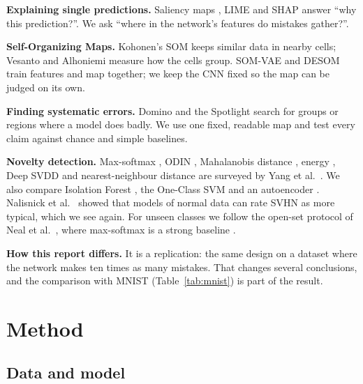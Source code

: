 \documentclass[11pt]{article}
\begin{document}
\textbf{Explaining single predictions.} Saliency maps \parencite{simonyan2014saliency}, LIME \parencite{ribeiro2016lime} and SHAP \parencite{lundberg2017shap} answer ``why this prediction?''. We ask ``where in the network's features do mistakes gather?''.

\textbf{Self-Organizing Maps.} Kohonen's SOM \parencite{kohonen1990som} keeps similar data in nearby cells; Vesanto and Alhoniemi \parencite{vesanto2000clustering} measure how the cells group. SOM-VAE \parencite{fortuin2019somvae} and DESOM \parencite{forest2021desom} train features and map together; we keep the CNN fixed so the map can be judged on its own.

\textbf{Finding systematic errors.} Domino \parencite{eyuboglu2022domino} and the Spotlight \parencite{deon2022spotlight} search for groups or regions where a model does badly. We use one fixed, readable map and test every claim against chance and simple baselines.

\textbf{Novelty detection.} Max-softmax \parencite{hendrycks2017baseline}, ODIN \parencite{liang2018odin}, Mahalanobis distance \parencite{lee2018mahalanobis}, energy \parencite{liu2020energy}, Deep SVDD \parencite{ruff2018deep} and nearest-neighbour distance \parencite{sun2022knn} are surveyed by Yang et al.\ \parencite{yang2024generalized}. We also compare Isolation Forest \parencite{liu2008isolation}, the One-Class SVM \parencite{scholkopf2001support} and an autoencoder \parencite{sakurada2014autoencoder}. Nalisnick et al.\ \parencite{nalisnick2019deep} showed that models of normal data can rate SVHN as more typical, which we see again. For unseen classes we follow the open-set protocol of Neal et al.\ \parencite{neal2018open}, where max-softmax is a strong baseline \parencite{vaze2022openset}.

\textbf{How this report differs.} It is a replication: the same design on a dataset where the network makes ten times as many mistakes. That changes several conclusions, and the comparison with MNIST (Table~\ref{tab:mnist}) is part of the result.

\section{Method}
\label{sec:method}

\subsection{Data and model}
\end{document}
